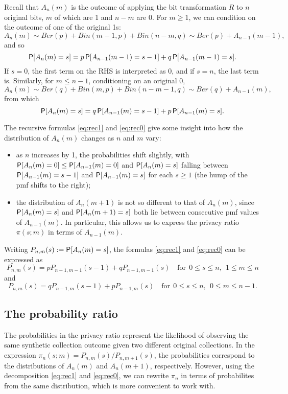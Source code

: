 \documentclass[11pt,draft]{article}
\begin{document}
Recall that $A_n(m)$ is the outcome of applying the bit transformation $R$ to $n$ original bits, $m$ of which are 1 and $n-m$ are 0.
For $m \geq 1$, we can condition on the outcome of one of the original 1s:
\[ A_n(m) \sim Ber(p) + Bin(m-1, p) + Bin(n-m, q) \sim Ber(p) + A_{n-1}(m-1), \]
and so
\begin{equation}\label{eq:rec1}
\P[A_n(m) = s] = p\P[A_{n-1}(m-1) = s-1] + q\P[A_{n-1}(m-1) = s].
\end{equation}
If $s = 0$, the first term on the RHS is interpreted as 0, and if $s = n$, the last term is.
Similarly, for $m \leq n-1$, conditioning on an original 0,
\[ A_n(m) \sim Ber(q) + Bin(m, p) + Bin(n-m-1, q) \sim Ber(q) + A_{n-1}(m), \]
from which
\begin{equation}\label{eq:rec0}
\P[A_n(m) = s] = q\P[A_{n-1}(m) = s-1] + p\P[A_{n-1}(m) = s].
\end{equation}

The recursive formulas \eqref{eq:rec1} and \eqref{eq:rec0} give some insight into how the distribution of $A_n(m)$ changes as $n$ and $m$ vary:
\begin{itemize}
\item  as $n$ increases by 1, the probabilities shift slightly, with $\P[A_n(m) = 0] \leq \P[A_{n-1}(m) = 0]$ and
$\P[A_n(m) = s]$ falling between $\P[A_{n-1}(m) = s-1]$ and $\P[A_{n-1}(m) = s]$ for each $s\geq 1$ (\ie the hump of the pmf shifts to the right);
\item the distribution of $A_n(m+1)$ is not so different to that of $A_n(m)$, since $\P[A_n(m) = s]$ and $\P[A_n(m+1) = s]$ both lie between consecutive pmf values of $A_{n-1}(m)$. In particular, this allows us to express the privacy ratio $\pi(s;m)$ in terms of $A_{n-1}(m)$.
\end{itemize}

Writing $P_{n,m}(s) := \P[A_n(m) = s]$, the formulas \eqref{eq:rec1} and \eqref{eq:rec0} can be expressed as
\[ P_{n,m}(s) = pP_{n-1,m-1}(s-1) + qP_{n-1,m-1}(s)
\quad\text{for}\ \ 0 \leq s \leq n,\ \ 1\leq m \leq n 
\]
and
\[ P_{n,m}(s) = qP_{n-1,m}(s-1) + pP_{n-1,m}(s)
\quad\text{for}\ \ 0 \leq s \leq n,\ \ 0\leq m \leq n-1.
\]

\subsection{The probability ratio}

The probabilities in the privacy ratio represent the likelihood of observing
the same synthetic collection outcome given two different original collections.
In the expression $\pi_n(s;m) = P_{n,m}(s) / P_{n,m+1}(s)$, the probabilities
correspond to the distributions of $A_n(m)$ and $A_n(m+1)$, respectively.
However, using the decomposition \eqref{eq:rec1} and \eqref{eq:rec0}, we can
rewrite $\pi_n$ in terms of probabilites from the same distribution, which is
more convenient to work with.
\end{document}

